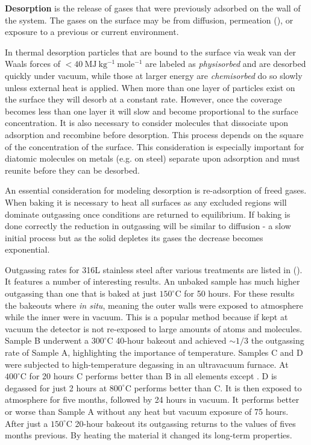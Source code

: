 \textbf{Desorption} is the release of gases that were previously adsorbed on the wall of the system.  The gases on the surface may be from
diffusion, permeation (), or exposure to a previous or current
environment.

In thermal desorption particles that are bound to the surface via weak van der Waals forces of
$< 40\ \mathrm{MJ\ kg^{-1}\ mole^{-1}}$ are labeled
as \textit{physisorbed} and are desorbed quickly under vacuum, while those at larger energy are \textit{chemisorbed} do so slowly unless
external heat is applied.  When more than one layer of particles exist on the surface they will desorb at a constant rate.  However, once
the coverage becomes less than one layer it will slow and become proportional to the surface concentration.  It is also necessary to
consider molecules that dissociate upon adsorption and recombine before desorption.  This process depends on the square of the
concentration
of the surface.  This consideration is especially important for diatomic molecules on metals (e.g.  on steel) separate upon
adsorption and must reunite before they can be desorbed.

An essential consideration for modeling desorption is re-adsorption of freed gases.  When baking it is necessary to heat all surfaces as
any excluded regions will dominate outgassing once conditions are returned to equilibrium.  If baking is done correctly the reduction in
outgassing will be similar to diffusion - a slow initial process but as the solid depletes its gases the decrease becomes
exponential.

Outgassing rates for 316L stainless steel after various treatments are listed in
 ().  It features a number of interesting
results.  An unbaked sample has
much higher outgassing than one that is baked at just $150^{\circ}\mathrm{C}$ for 50 hours.  For these results the bakeouts where
\textit{in situ}, meaning the outer walls were exposed to atmosphere while the inner were in vacuum.  This is a popular method because
if kept at vacuum the detector is not re-exposed to large amounts of atoms and molecules.  Sample B underwent a $300^{\circ}\mathrm{C}$
40-hour bakeout and achieved ${\sim} 1/3$ the outgassing rate of Sample A, highlighting the importance of temperature.  Samples C and D
were subjected to high-temperature degassing in an ultravacuum furnace.  At $400^{\circ}\mathrm{C}$ for 20 hours C performs better than B
in all elements except .  D is degassed for just 2 hours at $800^{\circ}\mathrm{C}$ performs better than C.  It is then exposed
to atmosphere for five months, followed by 24 hours in vacuum.  It performs better or worse than Sample A without any heat but vacuum
exposure of 75 hours.  After just a $150^{\circ}\mathrm{C}$ 20-hour bakeout its outgassing returns to the values of fives months
previous.  By heating the material it changed its long-term properties.

